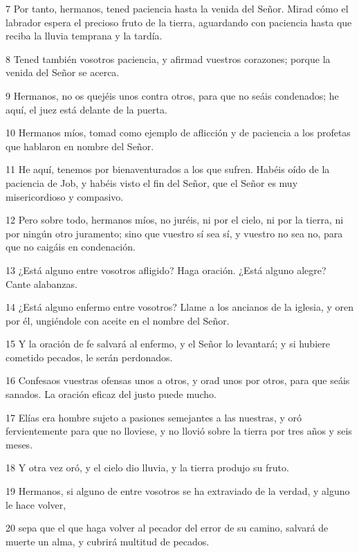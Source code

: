 \par 7 Por tanto, hermanos, tened paciencia hasta la venida del Señor. Mirad cómo el labrador espera el precioso fruto de la tierra, aguardando con paciencia hasta que reciba la lluvia temprana y la tardía.
\par 8 Tened también vosotros paciencia, y afirmad vuestros corazones; porque la venida del Señor se acerca.
\par 9 Hermanos, no os quejéis unos contra otros, para que no seáis condenados; he aquí, el juez está delante de la puerta.
\par 10 Hermanos míos, tomad como ejemplo de aflicción y de paciencia a los profetas que hablaron en nombre del Señor.
\par 11 He aquí, tenemos por bienaventurados a los que sufren. Habéis oído de la paciencia de Job, y habéis visto el fin del Señor, que el Señor es muy misericordioso y compasivo.
\par 12 Pero sobre todo, hermanos míos, no juréis, ni por el cielo, ni por la tierra, ni por ningún otro juramento; sino que vuestro sí sea sí, y vuestro no sea no, para que no caigáis en condenación.
\par 13 ¿Está alguno entre vosotros afligido? Haga oración. ¿Está alguno alegre? Cante alabanzas.
\par 14 ¿Está alguno enfermo entre vosotros? Llame a los ancianos de la iglesia, y oren por él, ungiéndole con aceite en el nombre del Señor.
\par 15 Y la oración de fe salvará al enfermo, y el Señor lo levantará; y si hubiere cometido pecados, le serán perdonados.
\par 16 Confesaos vuestras ofensas unos a otros, y orad unos por otros, para que seáis sanados. La oración eficaz del justo puede mucho.
\par 17 Elías era hombre sujeto a pasiones semejantes a las nuestras, y oró fervientemente para que no lloviese, y no llovió sobre la tierra por tres años y seis meses.
\par 18 Y otra vez oró, y el cielo dio lluvia, y la tierra produjo su fruto.
\par 19 Hermanos, si alguno de entre vosotros se ha extraviado de la verdad, y alguno le hace volver,
\par 20 sepa que el que haga volver al pecador del error de su camino, salvará de muerte un alma, y cubrirá multitud de pecados.

